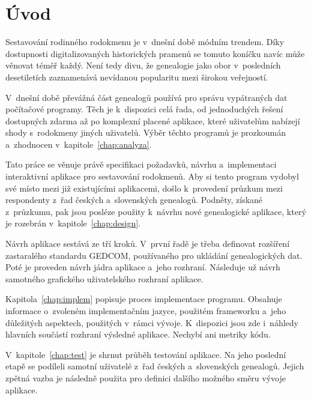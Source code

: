 

\chapter{Úvod}

 Sestavování rodinného rodokmenu je v~dnešní době módním trendem. Díky dostupnosti digitalizovaných historických pramenů se tomuto koníčku navíc může věnovat téměř každý. Není tedy divu, že genealogie jako obor v~posledních desetiletích zaznamenává nevídanou popularitu mezi širokou veřejností. \par
 V~dnešní době převážná část genealogů používá pro správu vypátraných dat počítačové programy. Těch je k~dispozici celá řada, od jednoduchých řešení dostupných zdarma až po komplexní placené aplikace, které uživatelům nabízejí shody s~rodokmeny jiných uživatelů. Výběr těchto programů je prozkoumán a~zhodnocen v~kapitole~\ref{chap:analyza}.\par
 Tato práce se věnuje právě specifikaci požadavků, návrhu a~implementaci interaktivní aplikace pro sestavování rodokmenů. Aby si tento program vydobyl své místo mezi již existujícími aplikacemi, došlo k~provedení průzkum mezi respondenty z~řad českých a~slovenských genealogů. Podněty, získané z~průzkumu, pak jsou posléze použity k~návrhu nové genealogické aplikace, který je rozebrán v~kapitole~\ref{chap:design}.\par
 Návrh aplikace sestává ze tří kroků. V~první řadě je třeba definovat rozšíření zastaralého standardu GEDCOM, používaného pro ukládání genealogických dat. Poté je proveden návrh jádra aplikace a~jeho rozhraní. Následuje už návrh samotného grafického uživatelského rozhraní aplikace.\par
 Kapitola~\ref{chap:implem} popisuje proces implementace programu. Obsahuje informace o~zvoleném implementačním jazyce, použitém frameworku a~jeho důležitých aspektech, použitých v~rámci vývoje. K~dispozici jsou zde i~náhledy hlavních součástí rozhraní výsledné aplikace. Nechybí ani metriky kódu.\par
 V~kapitole~\ref{chap:test} je shrnut průběh testování aplikace. Na jeho poslední etapě se podíleli samotní uživatelé z~řad českých a~slovenských genealogů. Jejich zpětná vazba je následně použita pro definici dalšího možného směru vývoje aplikace.\par 

